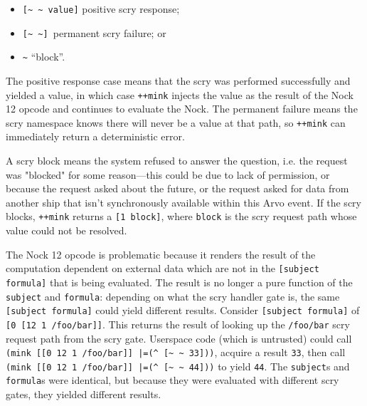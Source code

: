 \documentclass[twoside]{article}
\begin{document}
\begin{itemize}
  \item  \lstinline[style=inlinecode]{[~ ~ value]} positive scry response;
  \item  \lstinline[style=inlinecode]{[~ ~] }permanent scry failure; or
  \item  \lstinline[style=inlinecode]{~} ``block''.
\end{itemize}

\noindent
The positive response case means that the scry was performed successfully and yielded a value, in which case \lstinline[style=inlinecode]{++mink} injects the value as the result of the Nock 12 opcode and continues to evaluate the Nock.  The permanent failure means the scry namespace knows there will never be a value at that path, so \lstinline[style=inlinecode]{++mink} can immediately return a deterministic error.

A scry block means the system refused to answer the question, i.e. the request was "blocked" for some reason—this could be due to lack of permission, or because the request asked about the future, or the request asked for data from another ship that isn't synchronously available within this Arvo event. If the scry blocks, \lstinline[style=inlinecode]{++mink} returns a \lstinline[style=inlinecode]{[1 block]}, where \lstinline[style=inlinecode]{block} is the scry request path whose value could not be resolved.

The Nock 12 opcode is problematic because it renders the result of the computation dependent on external data which are not in the \lstinline[style=inlinecode]{[subject formula]} that is being evaluated.  The result is no longer a pure function of the \lstinline[style=inlinecode]{subject} and \lstinline[style=inlinecode]{formula}:  depending on what the scry handler gate is, the same \lstinline[style=inlinecode]{[subject formula]} could yield different results.  Consider \lstinline[style=inlinecode]{[subject formula]} of \lstinline[style=inlinecode]{[0 [12 1 /foo/bar]]}.  This returns the result of looking up the \lstinline[style=inlinecode]{/foo/bar} scry request path from the scry gate. Userspace code (which is untrusted) could call \lstinline[style=inlinecode]{(mink [[0 12 1 /foo/bar]] |=(^ [~ ~ 33]))}, acquire a result \lstinline[style=inlinecode]{33}, then call \lstinline[style=inlinecode]{(mink [[0 12 1 /foo/bar]] |=(^ [~ ~ 44]))} to yield \lstinline[style=inlinecode]{44}.  The \lstinline[style=inlinecode]{subject}s and \lstinline[style=inlinecode]{formula}s were identical, but because they were evaluated with different scry gates, they yielded different results.
\end{document}
